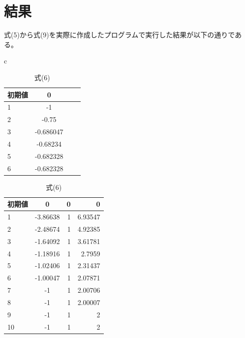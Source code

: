 \documentclass{jsarticle}
\begin{document}
\section{結果}
式(5)から式(9)を実際に作成したプログラムで実行した結果が以下の通りである。
\vspace{10zh}
\begin{table}[htbp]
    \begin{center}
        \begin{tabular}{c}

            \begin{minipage}{0.3\hsize}
                \begin{center}
                    \begin{tabular}{|l|c|r||r|} \hline
                        初期値 & 0\\ \hline \hline
                        1 & -1\\ \hline
                        2 & -0.75\\ \hline
                        3 & -0.686047\\ \hline
                        4 & -0.68234\\ \hline
                        5 & -0.682328\\ \hline
                        6 & -0.682328\\ \hline
                    \end{tabular}
                    \caption{式(5)}
                \end{center}
            \end{minipage}

            \begin{minipage}{0.3\hsize}
                \begin{center}
                    \begin{tabular}{|l|c|r||r|} \hline
                        初期値 & 0 & 0 & 0 \\ \hline \hline
                        1 & -3.86638  &  1 &  6.93547\\ \hline
                        2 & -2.48674  &  1 &  4.92385\\ \hline
                        3 & -1.64092  &  1 &  3.61781\\ \hline
                        4 & -1.18916  &  1 &  2.7959\\ \hline
                        5 & -1.02406  &  1 &  2.31437\\ \hline
                        6 & -1.00047  &  1 &  2.07871\\ \hline
                        7 & -1 & 1 & 2.00706\\ \hline
                        8 & -1 & 1 & 2.00007\\ \hline
                        9 & -1 & 1 & 2\\ \hline
                        10 &   -1 & 1 &  2\\ \hline
                    \end{tabular}
                    \caption{式(6)}
                \end{center}
            \end{minipage}


\end{tabular}
\end{center}
\end{table}
\end{document}
